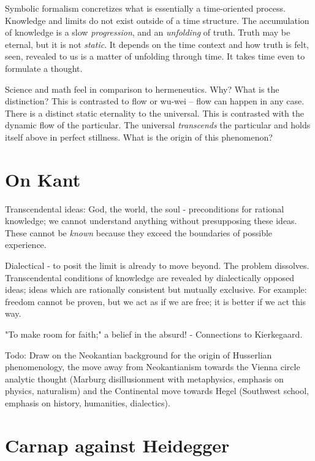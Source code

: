 \documentclass[]{turabian-researchpaper}
\begin{document}
	Symbolic formalism concretizes what is essentially a time-oriented process.
	Knowledge and limits do not exist outside of a time structure. The accumulation
	of knowledge is a slow \emph{progression}, and an \emph{unfolding} of truth. Truth
	may be eternal, but it is not \emph{static}. It depends on the time context
	and how truth is felt, seen, revealed to us is a matter of unfolding through
	time. It takes time even to formulate a thought.

	Science and math feel  in comparison to hermeneutics. Why?
	What is the distinction? This is contrasted to flow or wu-wei -- flow can
	happen in any case. There is a distinct static eternality to the universal.
	This is contrasted with the dynamic flow of the particular. The universal \emph{transcends}
	the particular and holds itself above in perfect stillness. What is the origin
	of this phenomenon?

	\section{On Kant}

	Transcendental ideas: God, the world, the soul - preconditions for rational knowledge;
	we cannot understand anything without presupposing these ideas. These cannot be
	\emph{known} because they exceed the boundaries of possible experience.

	Dialectical - to posit the limit is already to move beyond. The problem dissolves.
	Transcendental conditions of knowledge are revealed by dialectically opposed
	ideas; ideas which are rationally consistent but mutually exclusive. For
	example: freedom cannot be proven, but we act as if we are free; it is better if
	we act this way.

	"To make room for faith;" a belief in the absurd! - Connections to Kierkegaard.

	Todo: Draw on the Neokantian background for the origin of Husserlian
	phenomenology, the move away from Neokantianism towards the Vienna circle analytic
	thought (Marburg disillusionment with metaphysics, emphasis on physics,
	naturalism) and the Continental move towards Hegel (Southwest school, emphasis
	on history, humanities, dialectics).

	\section{Carnap against Heidegger}
\end{document}
